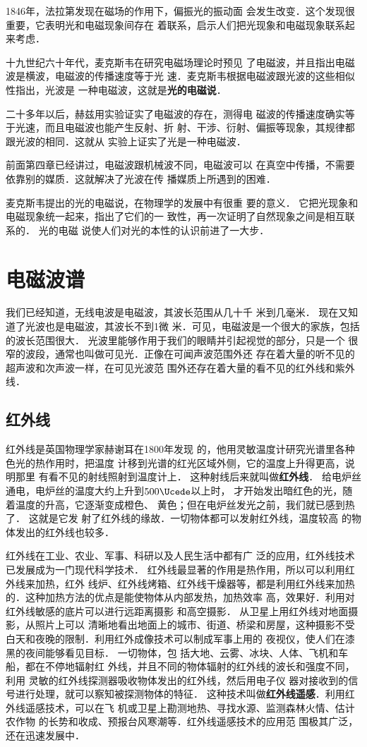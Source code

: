 1846年，法拉第发现在磁场的作用下，偏振光的振动面
会发生改变．这个发现很重要，它表明光和电磁现象间存在
着联系，启示人们把光现象和电磁现象联系起来考虑．

十九世纪六十年代，麦克斯韦在研究电磁场理论时预见
了电磁波，并且指出电磁波是横波，电磁波的传播速度等于光
速．麦克斯韦根据电磁波跟光波的这些相似性指出，光波是
一种电磁波，这就是\textbf{光的电磁说}．

二十多年以后，赫兹用实验证实了电磁波的存在，测得电
磁波的传播速度确实等于光速，而且电磁波也能产生反射、折
射、干涉、衍射、偏振等现象，其规律都跟光波的相同．这就从
实验上证实了光是一种电磁波．

前面第四章已经讲过，电磁波跟机械波不同，电磁波可以
在真空中传播，不需要依靠别的媒质．这就解决了光波在传
播媒质上所遇到的困难．

麦克斯韦提出的光的电磁说，在物理学的发展中有很重
要的意义．
它把光现象和电磁现象统一起来，指出了它们的一
致性，再一次证明了自然现象之间是相互联系的．
光的电磁
说使人们对光的本性的认识前进了一大步．

\section{电磁波谱}
我们已经知道，无线电波是电磁波，其波长范围从几十千
米到几毫米．
现在又知道了光波也是电磁波，其波长不到1微
米．可见，电磁波是一个很大的家族，包括的波长范围很大．
光波里能够作用于我们的眼睛并引起视觉的部分，只是一个
很窄的波段，通常也叫做可见光．正像在可闻声波范围外还
存在着大量的听不见的超声波和次声波一样，在可见光波范
围外还存在着大量的看不见的红外线和紫外线．

\subsection{红外线}

红外线是英国物理学家赫谢耳在1800年发现
的，他用灵敏温度计研究光谱里各种色光的热作用时，把温度
计移到光谱的红光区域外侧，它的温度上升得更高，说明那里
有看不见的射线照射到温度计上．
这种射线后来就叫做\textbf{红外线}．
给电炉丝通电，电炉丝的温度大约上升到$500\Ucede$以上时，
才开始发出暗红色的光，随着温度的升高，它逐渐变成橙色、
黄色；但在电炉丝发光之前，我们就已感到热了．
这就是它发
射了红外线的缘故．一切物体都可以发射红外线，温度较高
的物体发出的红外线也较多．

红外线在工业、农业、军事、科研以及人民生活中都有广
泛的应用，红外线技术已发展成为一门现代科学技术．
红外线最显著的作用是热作用，所以可以利用红外线来加热，红外
线炉、红外线烤箱、红外线干燥器等，都是利用红外线来加热
的．这种加热方法的优点是能使物体从内部发热，加热效率
高，效果好．利用对红外线敏感的底片可以进行远距离摄影
和高空摄影．
从卫星上用红外线对地面摄影，从照片上可以
清晰地看出地面上的城市、街道、桥梁和房屋，这种摄影不受
白天和夜晚的限制．利用红外成像技术可以制成军事上用的
夜视仪，使人们在漆黑的夜间能够看见目标．
一切物体，包
括大地、云雾、冰块、人体、飞机和车船，都在不停地辐射红
外线，并且不同的物体辐射的红外线的波长和强度不同，利用
灵敏的红外线探测器吸收物体发出的红外线，然后用电子仪
器对接收到的信号进行处理，就可以察知被探测物体的特征．
这种技术叫做\textbf{红外线遥感}．利用红外线遥感技术，可以在飞
机或卫星上勘测地热、寻找水源、监测森林火情、估计农作物
的长势和收成、预报台风寒潮等．红外线遥感技术的应用范
围极其广泛，还在迅速发展中．

